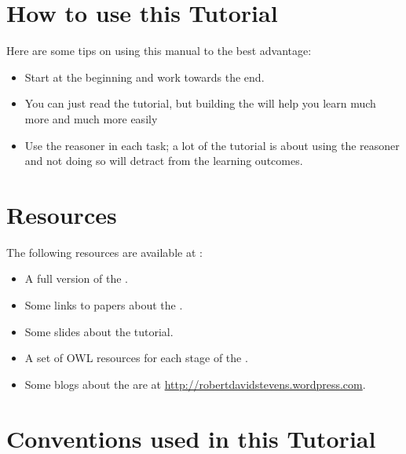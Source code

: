 
\section{How to use this Tutorial}

Here are some tips on using this manual to the best advantage:

\begin{itemize}
\item Start at the beginning and work towards the end.
\item You can just read  the tutorial, but building the \fhkb will help you learn much more and much more easily
\item Use the reasoner in each task; a lot of the \fhkb tutorial is about using the reasoner and not doing so will detract from the learning outcomes.
\end{itemize}


\section{\fhkb Resources}

The following resources are available at \fhkbhome :
\begin{itemize}
\item A full version of the \stevens \fhkb.
\item Some links to papers about the \fhkb.
\item Some slides about the \fhkb tutorial.
\item A set of OWL resources for each stage of the \fhkb.
\item Some blogs about the \fhkb are at \url{http://robertdavidstevens.wordpress.com}.
\end{itemize}


\section{Conventions used in this Tutorial}


